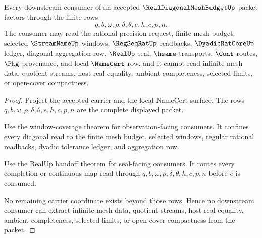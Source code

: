\begin{theorem}
\label{thm:real-diagonal-mesh-budget-nonescape}
Every downstream consumer of an accepted $\RealDiagonalMeshBudgetUp$ packet factors through the finite rows
$$
q,b,\omega,\rho,\delta,\theta,e,h,c,p,n.
$$
The consumer may read the rational precision request, finite mesh budget, selected $\StreamNameUp$ windows, $\RegSeqRatUp$ readbacks, $\DyadicRatCoreUp$ ledger, diagonal aggregation row, $\RealUp$ seal, $\hsame$ transports, $\Cont$ routes, $\Pkg$ provenance, and local $\NameCert$ row, and it cannot read infinite-mesh data, quotient streams, host real equality, ambient completeness, selected limits, or open-cover compactness.
\end{theorem}
\begin{proof}
Project the accepted carrier and the local NameCert surface. The rows $q,b,\omega,\rho,\delta,\theta,e,h,c,p,n$ are the complete displayed packet.

Use the window-coverage theorem for observation-facing consumers. It confines every diagonal read to the finite mesh budget, selected windows, regular rational readbacks, dyadic tolerance ledger, and aggregation row.

Use the RealUp handoff theorem for seal-facing consumers. It routes every completion or continuous-map read through $q,b,\omega,\rho,\delta,\theta,h,c,p,n$ before $e$ is consumed.

No remaining carrier coordinate exists beyond those rows. Hence no downstream consumer can extract infinite-mesh data, quotient streams, host real equality, ambient completeness, selected limits, or open-cover compactness from the packet.
\end{proof}

